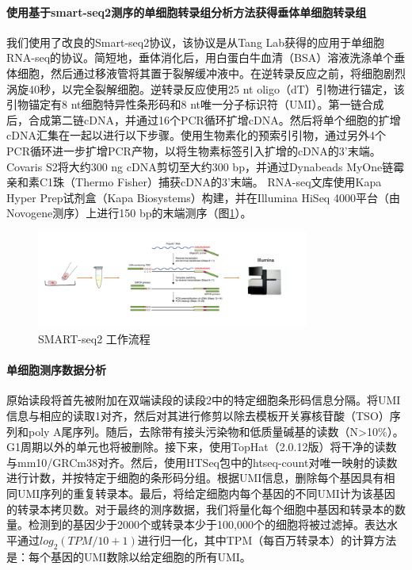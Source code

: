 \paragraph{使用基于smart-seq2测序的单细胞转录组分析方法获得垂体单细胞转录组}
  我们使用了改良的Smart-seq2协议，该协议是从Tang Lab获得的应用于单细胞RNA-seq的协议。简短地，垂体消化后，用白蛋白牛血清（BSA）溶液洗涤单个垂体细胞，然后通过移液管将其置于裂解缓冲液中。在逆转录反应之前，将细胞剧烈涡旋40秒，以完全裂解细胞。逆转录反应使用25 nt oligo（dT）引物进行锚定，该引物锚定有8 nt细胞特异性条形码和8 nt唯一分子标识符（UMI）。第一链合成后，合成第二链cDNA，并通过16个PCR循环扩增cDNA。然后将单个细胞的扩增cDNA汇集在一起​​以进行以下步骤。使用生物素化的预索引引物，通过另外4个PCR循环进一步扩增PCR产物，以将生物素标签引入扩增的cDNA的3'末端。 Covaris S2将大约300 ng cDNA剪切至大约300 bp，并通过Dynabeads MyOne链霉亲和素C1珠（Thermo Fisher）捕获cDNA的3'末端。 RNA-seq文库使用Kapa Hyper Prep试剂盒（Kapa Biosystems）构建，并在Illumina HiSeq 4000平台（由Novogene测序）上进行150 bp的末端测序（图\ref{fig:scseq-smart}）。
\begin{figure}[!htb]
  \centering
  \includegraphics[width=0.8\textwidth]{figs/scseq-smart.png}
  \caption{SMART-seq2 工作流程}
  \label{fig:scseq-smart}
\end{figure}
\paragraph{单细胞测序数据分析}
  原始读段将首先被附加在双端读段的读段2中的特定细胞条形码信息分隔。将UMI信息与相应的读取1对齐，然后对其进行修剪以除去模板开关寡核苷酸（TSO）序列和poly A尾序列。随后，去除带有接头污染物和低质量碱基的读数（N>10\%）。 G1周期以外的单元也将被删除。接下来，使用TopHat（2.0.12版）将干净的读数与mm10/GRCm38对齐。然后，使用HTSeq包中的htseq-count对唯一映射的读数进行计数，并按特定于细胞的条形码分组。根据UMI信息，删除每个基因具有相同UMI序列的重复转录本。最后，将给定细胞内每个基因的不同UMI计为该基因的转录本拷贝数。对于最终的测序数据，我们将量化每个细胞中基因和转录本的数量。检测到的基因少于2000个或转录本少于100,000个的细胞将被过滤掉。表达水平通过$log_{2}(TPM/10+1)$进行归一化，其中TPM（每百万转录本）的计算方法是：每个基因的UMI数除以给定细胞的所有UMI。

